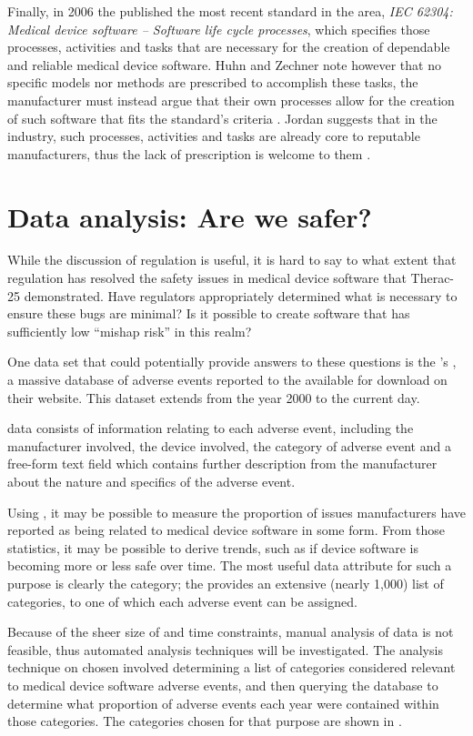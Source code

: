 \documentclass{cshonours}
\newcommand{\ther}{Therac-25\xspace}
\begin{document}
Finally, in 2006 the \iec published the most recent standard in the area, \textit{IEC 62304: Medical device software -- Software life cycle processes}, which specifies those processes, activities and tasks that are necessary for the creation of dependable and reliable medical device software. Huhn and Zechner note however that no specific models nor methods are prescribed to accomplish these tasks, the manufacturer must instead argue that their own processes allow for the creation of such software that fits the standard's criteria \cite{huhn2010arguing}. Jordan suggests that in the industry, such processes, activities and tasks are already core to reputable manufacturers, thus the lack of prescription is welcome to them \cite{jordan2006standard}.


\chapter{Data analysis: Are we safer?}
\label{chap:data}
While the discussion of regulation is useful, it is hard to say to what extent that regulation has resolved the safety issues in medical device software that \ther demonstrated. Have regulators appropriately determined what is necessary to ensure these bugs are minimal? Is it possible to create software that has sufficiently low ``mishap risk'' in this realm?

One data set that could potentially provide answers to these questions is the \fda's \maude, a massive database of adverse events reported to the \fda available for download on their website. This dataset extends from the year 2000 to the current day.

\maude data consists of information relating to each adverse event, including the manufacturer involved, the device involved, the category of adverse event and a free-form text field which contains further description from the manufacturer about the nature and specifics of the adverse event.

Using \maude, it may be possible to measure the proportion of issues manufacturers have reported as being related to medical device software in some form. From those statistics, it may be possible to derive trends, such as if device software is becoming more or less safe over time. The most useful data attribute for such a purpose is clearly the category; the \fda provides an extensive (nearly 1,000) list of categories, to one of which each adverse event can be assigned.

Because of the sheer size of \maude and time constraints, manual analysis of data is not feasible, thus automated analysis techniques will be investigated. The analysis technique on \maude chosen involved determining a list of categories considered relevant to medical device software adverse events, and then querying the database to determine what proportion of adverse events each year were contained within those categories. The categories chosen for that purpose are shown in .
\end{document}
